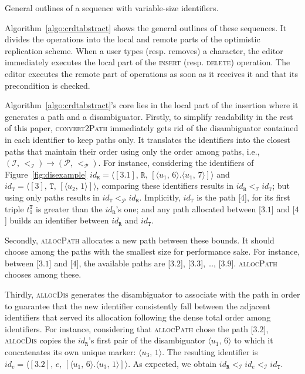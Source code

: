 \begin{algorithm}
  
  \caption{\label{algo:crdtabstract}General outlines of a sequence with
    variable-size identifiers.}
\end{algorithm}


Algorithm~\ref{algo:crdtabstract} shows the general outlines of these
sequences. It divides the operations into the local and remote parts of the
optimistic replication scheme. When a user types (resp. removes) a character,
the editor immediately executes the local part of the \textsc{insert}
(resp. \textsc{delete}) operation. The editor executes the remote part of
operations as soon as it receives it and that its precondition is checked.

\noindent Algorithm~\ref{algo:crdtabstract}'s core lies in the local part of the
insertion where it generates a path and a disambiguator. Firstly, to simplify
readability in the rest of this paper, \textsc{convert2Path} immediately gets
rid of the disambiguator contained in each identifier to keep paths only.
It translates the identifiers into the closest paths that maintain their order
using only the order among paths, i.e.,
$(\mathcal{I},\, <_\mathcal{I}) \rightarrow (\mathcal{P},\, <_{\mathcal{P}})$.
For instance, considering the identifiers of Figure~\ref{fig:disexample}
$id_\texttt{R} = \langle [3.1],\, \texttt{R}, \, [\langle u_1,\,6
\rangle.\langle u_1,\,7 \rangle] \rangle$
and
$id_\texttt{T} = \langle [3],\, \texttt{T}, \, [\langle u_2,\,1 \rangle]
\rangle$,
comparing these identifiers results in
$id_\texttt{R}<_\mathcal{I} id_\texttt{T}$; but using only paths results in
$id_\texttt{T} <_\mathcal{P} id_\texttt{R}$. Implicitly, $id_\texttt{T}$ is the
path [$4$], for its first triple $t_1^{\texttt{T}}$ is greater than the
$id_\texttt{R}$'s one; and any path allocated between [$3.1$] and [$4$] builds
an identifier between $id_\texttt{R}$ and $id_\texttt{T}$.


\noindent Secondly, \textsc{allocPath} allocates a new path between these
bounds. It should choose among the paths with the smallest size for performance
sake. For instance, between [$3.1$] and [$4$], the available paths are [$3.2$],
[$3.3$], \ldots, [$3.9$]. \textsc{allocPath} chooses among these.


\noindent Thirdly, \textsc{allocDis} generates the disambiguator to associate
with the path in order to guarantee that the new identifier consistently fall
between the adjacent identifiers that served its allocation following the dense
total order among identifiers. For instance, considering that \textsc{allocPath}
chose the path [$3.2$], \textsc{allocDis} copies the $id_\texttt{R}$'s first
pair of the disambiguator $\langle u_1,\,6 \rangle$ to which it concatenates its
own unique marker: $\langle u_3,\,1 \rangle$. The resulting identifier is
$id_e = \langle [3.2],\, e, \, [\langle u_1,\,6 \rangle .\langle u_3,\, 1\rangle ]
\rangle$.
As expected, we obtain
$id_\texttt{R} <_\mathcal{I} id_{e} <_\mathcal{I} id_\texttt{T}$.

